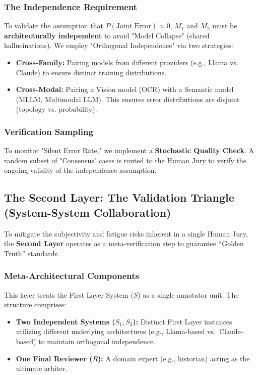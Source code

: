 \subsubsection{The Independence Requirement}
To validate the assumption that $P(\text{Joint Error}) \approx 0$, $M_1$ and $M_2$ must be \textbf{architecturally independent} to avoid "Model Collapse" (shared hallucinations). We employ "Orthogonal Independence" via two strategies:
\begin{itemize}
    \item \textbf{Cross-Family:} Pairing models from different providers (e.g., Llama vs. Claude) to ensure distinct training distributions.
    \item \textbf{Cross-Modal:} Pairing a Vision model (OCR) with a Semantic model (MLLM, Multimodal LLM). This ensures error distributions are disjoint (topology vs. probability).
\end{itemize}

\subsubsection{Verification Sampling}
To monitor "Silent Error Rate," we implement a \textbf{Stochastic Quality Check}. A random subset of "Consensus" cases is routed to the Human Jury to verify the ongoing validity of the independence assumption.

\subsection{The Second Layer: The Validation Triangle (System-System Collaboration)}
\label{subsec:layer2}

To mitigate the subjectivity and fatigue risks inherent in a single Human Jury, the \textbf{Second Layer}  operates as a meta-verification step to guarantee ``Golden Truth'' standards.

\subsubsection{Meta-Architectural Components}
This layer treats the First Layer System ($S$) as a single annotator unit. The structure comprises:
\begin{itemize}
    \item \textbf{Two Independent Systems ($S_1, S_2$):} Distinct First Layer instances utilizing different underlying architectures (e.g., Llama-based vs.\ Claude-based) to maintain orthogonal independence.
    \item \textbf{One Final Reviewer ($R$):} A domain expert (e.g., historian) acting as the ultimate arbiter.
\end{itemize}


